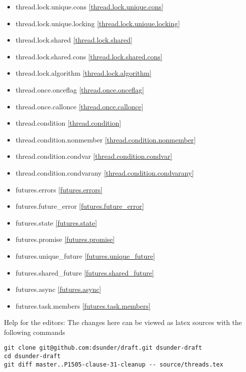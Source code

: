 \begin{multicols}{2}
\begin{itemize}
\item{thread.lock.unique.cons               \ref{thread.lock.unique.cons}}
\item{thread.lock.unique.locking            \ref{thread.lock.unique.locking}}
\item{thread.lock.shared                    \ref{thread.lock.shared}}
\item{thread.lock.shared.cons               \ref{thread.lock.shared.cons}}
\item{thread.lock.algorithm                 \ref{thread.lock.algorithm}}
\item{thread.once.onceflag                  \ref{thread.once.onceflag}}
\item{thread.once.callonce                  \ref{thread.once.callonce}}
\item{thread.condition                      \ref{thread.condition}}
\item{thread.condition.nonmember            \ref{thread.condition.nonmember}}
\item{thread.condition.condvar              \ref{thread.condition.condvar}}
\item{thread.condition.condvarany           \ref{thread.condition.condvarany}}
\item{futures.errors                        \ref{futures.errors}}
\item{futures.future_error                  \ref{futures.future_error}}
\item{futures.state                         \ref{futures.state}}
\item{futures.promise                       \ref{futures.promise}}
\item{futures.unique_future                 \ref{futures.unique_future}}
\item{futures.shared_future                 \ref{futures.shared_future}}
\item{futures.async                         \ref{futures.async}}
\item{futures.task.members                  \ref{futures.task.members}}

\end{itemize}
\end{multicols}


\vfill
Help for the editors: The changes here can be viewed as latex sources with the following commands
\begin{verbatim}
git clone git@github.com:dsunder/draft.git dsunder-draft
cd dsunder-draft
git diff master..P1505-clause-31-cleanup -- source/threads.tex
\end{verbatim}
\newpage
